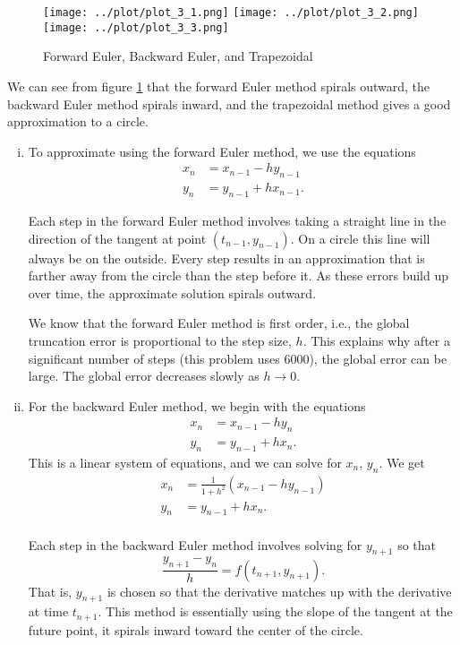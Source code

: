 \begin{solution}
  \begin{figure}[!ht]
    \centering
    \texttt{[image: ../plot/plot\_3\_1.png]}
    \texttt{[image: ../plot/plot\_3\_2.png]}
    \texttt{[image: ../plot/plot\_3\_3.png]}
    \caption{Forward Euler, Backward Euler, and Trapezoidal}
    \label{fig:prob3}
  \end{figure}
  We can see from figure \ref{fig:prob3} that the forward Euler method spirals outward, the backward Euler method spirals inward, and the trapezoidal method gives a good approximation to a circle.
  
  \begin{enumerate}[(i)]
    \item 
    To approximate using the forward Euler method, we use the equations
    \begin{align*}
      x_n &= x_{n-1} - h y_{n-1} \\
      y_n &= y_{n-1} + h x_{n-1}.
    \end{align*}
    
    Each step in the forward Euler method involves taking a straight line in the direction of the tangent at point $(t_{n-1}, y_{n-1})$. On a circle this line will always be on the outside. Every step results in an approximation that is farther away from the circle than the step before it. As these errors build up over time, the approximate solution spirals outward.
    
    We know that the forward Euler method is first order, i.e., the global truncation error is proportional to the step size, $h$. This explains why after a significant number of steps (this problem uses 6000), the global error can be large. The global error decreases slowly as $h \to 0$.
    \item
    For the backward Euler method, we begin with the equations
    \begin{align*}
      x_n &= x_{n-1} - h y_n \\
      y_n &= y_{n-1} + h x_n.
    \end{align*}
    This is a linear system of equations, and we can solve for $x_n$, $y_n$. We get
    \begin{align*}
      x_n &= \frac{1}{1+h^2}(x_{n-1} - h y_{n-1}) \\
      y_n &= y_{n-1} + h x_n. \\
    \end{align*}
    
    Each step in the backward Euler method involves solving for $y_{n+1}$ so that 
    \[
      \frac{y_{n+1} - y_{n}}{h} = f(t_{n+1}, y_{n+1}).
    \]
    That is, $y_{n+1}$ is chosen so that the derivative matches up with the derivative at time $t_{n+1}$. This method is essentially using the slope of the tangent at the future point, it spirals inward toward the center of the circle.
    

\end{enumerate}
\end{solution}
